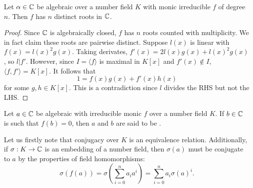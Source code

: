 
\begin{lemma}\label{monic-irreducible-has-all-roots}
Let $\alpha\in \mathbb{C}$ be algebraic over a number field $K$ with monic irreducible $f$ of degree $n$. Then $f$ has $n$ distinct roots in $\mathbb{C}$.
\end{lemma}
\begin{proof}
Since $\mathbb{C}$ is algebraically closed, $f$ has $n$ roots counted with multiplicity. We in fact claim these roots are pairwise distinct. Suppose $l(x)$ is linear with $f(x)=l(x)^2g(x)$. Taking derivates, $f'(x)=2l(x)g(x)+l(x)^2g(x)$, so $l|f'$. However, since $I=\langle f \rangle$ is maximal in $K[x]$ and $f'(x)\not \in I$, $\langle f, f'\rangle=K[x]$. It follows that $$1=f(x)g(x)+f'(x)h(x)$$ for some $g,h\in K[x]$. This is a contradiction since $l$ divides the RHS but not the LHS.
\end{proof}

\begin{definition}
Let $a\in \mathbb{C}$ be algebraic with irreducible monic $f$ over a number field $K$. If $b\in \mathbb{C}$ is such that $f(b)=0$, then $a$ and $b$ are said to be .
\end{definition}

Let us firstly note that conjugacy over $K$ is an equivalence relation. Additionally, if $\sigma:K\rightarrow \mathbb{C}$ is an embedding of a number field, then $\sigma(a)$ must be conjugate to $a$ by the properties of field homomorphisms:
$$\sigma(f(a))=\sigma(\sum_{i=0}^n a_i a^i)=\sum_{i=0}^n a_i \sigma(a)^i.$$

